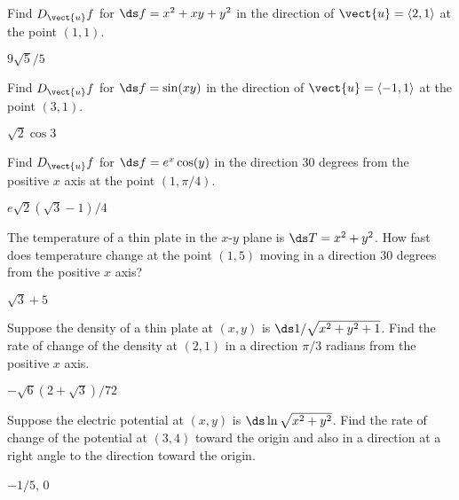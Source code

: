 \begin{enumialphparenastyle}

\begin{ex}
Find $D_{\vect{u}} f$ for 
$\ds f=x^2+xy+y^2$ in the direction of $\vect{u}=\langle 2,1\rangle$ 
at the point $(1,1)$.
\begin{sol}
$9\sqrt5/5$
\end{sol}
\end{ex}

\begin{ex}
Find $D_{\vect{u}} f$ for 
$\ds f=\sin(xy)$ in the direction of $\vect{u}=\langle -1,1\rangle$ 
at the point $(3,1)$.
\begin{sol}
$\sqrt2\cos3$
\end{sol}
\end{ex}

\begin{ex}
Find $D_{\vect{u}} f$ for 
$\ds f=e^x\cos(y)$ in the direction 30 degrees from the positive $x$ axis
at the point $(1,\pi/4)$.
\begin{sol}
$e\sqrt2(\sqrt3-1)/4$
\end{sol}
\end{ex}

\begin{ex}
The temperature of a thin plate in the $x$-$y$ plane is 
$\ds T=x^2+y^2$. How fast does temperature change at the point $(1,5)$
moving in a direction 30 degrees from the positive $x$ axis?
\begin{sol}
$\sqrt3+5$
\end{sol}
\end{ex}

\begin{ex}
Suppose the density of a thin plate at $(x,y)$ is
$\ds 1/\sqrt{x^2+y^2+1}$. Find the rate of change of the density at
$(2,1)$ in a direction $\pi/3$ radians from the positive $x$ axis.
\begin{sol}
$-\sqrt6(2+\sqrt3)/72$
\end{sol}
\end{ex}

\begin{ex}
Suppose the electric potential at $(x,y)$ is
$\ds\ln\sqrt{x^2+y^2}$. Find the rate of change of the potential at
$(3,4)$ toward the origin and also in a direction at a right angle to
the direction toward the origin.
\begin{sol}
$-1/5$, $0$
\end{sol}
\end{ex}


\end{enumialphparenastyle}
